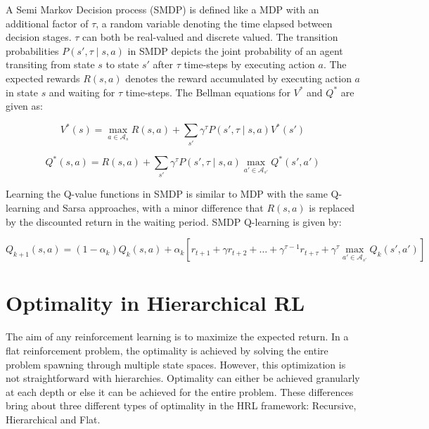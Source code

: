 A Semi Markov Decision process (SMDP) is defined like a MDP with an additional factor of \(\tau\), a random variable denoting the time elapsed between decision stages. \(\tau\) can both be real-valued and discrete valued. The transition probabilities \(P(s', \tau \mid s,a)\) in SMDP depicts the joint probability of an agent transiting from state \(s\) to state \(s'\)  after \(\tau\) time-steps by executing action \(a\). The expected rewards \(R(s,a)\) denotes the reward accumulated by executing action \(a\) in state \(s\) and waiting for \(\tau\) time-steps. The Bellman equations for \(V^*\) and \(Q^*\) are given as:

\begin{equation}
    V^* (s)=   \max_{a \in \mathcal{A}_s }⁡ R(s,a)   + \sum_{s'} \gamma^\tau P(s',\tau \mid s,a) V^* (s')
\end{equation}

\begin{equation}
    Q^* (s,a)=R(s,a) + \sum_{s'} \gamma^\tau P(s', \tau \mid s,a)   \max_{a' \in \mathcal{A}_{s'}}⁡ Q^* (s',a')
\end{equation}

Learning the Q-value functions in SMDP is similar to MDP with the same Q-learning and Sarsa approaches, with a minor difference that \(R(s,a)\) is replaced by the discounted return in the waiting period. SMDP Q-learning is given by:

\begin{equation}
    Q_{k+1} (s,a)=(1-\alpha_k ) Q_k (s,a)+\alpha_k[r_{t+1}+\gamma r_{t+2}+ \dots + \gamma^{\tau-1} r_{t+\tau}+ \gamma ^\tau   \max_{a' \in \mathcal{A}_{s'}}⁡ Q_k (s',a' )]
\end{equation}


\section{Optimality in Hierarchical RL}

The aim of any reinforcement learning is to maximize the expected return. In a flat reinforcement problem, the optimality is achieved by solving the entire problem spawning through multiple state spaces. However, this optimization is not straightforward with hierarchies. Optimality can either be achieved granularly at each depth or else it can be achieved for the entire problem. These differences bring about three different types of optimality in the HRL framework: Recursive, Hierarchical and Flat. 


